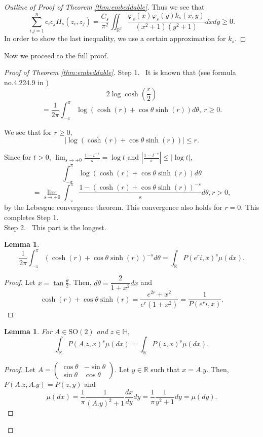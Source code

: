 \documentclass[journal]{IEEEtran}
\newtheorem{lemma}[theorem]{Lemma}
\begin{document}
\begin{proof}[Outline of Proof of Theorem \ref{thm:embeddable}]
Thus we see that 
\[ \sum_{i.j=1}^{n} c_i c_j H_s (z_i, z_j) = \frac{C_s}{\pi^2} \iint_{\mathbb R^2} \frac{\varphi_s (x) \varphi_s (y) k_s (x,y)}{(x^2 + 1)(y^2 + 1)} dxdy \ge 0. \]
In order to show the last inequality, we use a certain approximation for $k_s$.  
\end{proof}
 
Now we proceed to the full proof. 

\begin{proof}[Proof of Theorem \ref{thm:embeddable}]
Step 1. \ 
It is known that (see formula no.4.224.9 in \cite{gradshteyn2014table})
\[ 2 \log \cosh \left(\frac{r}{2}\right) \]
\[= \frac{1}{2\pi} \int_{-\pi}^{\pi} \log\left(\cosh(r) + \cos\theta \sinh (r) \right) d\theta,  \ r \ge 0. \]

We see that for $r \ge 0$, 
\[ \left|\log (\cosh(r) + \cos\theta \sinh (r)) \right| \le r.  \]

Since for $t > 0$, $\displaystyle\lim_{s \to +0} \frac{1 - t^{-s}}{s} = \log t$ 
and $\displaystyle\left|\frac{1 - t^{-s}}{s}\right| \le |\log t|$, 
\[ \int_{-\pi}^{\pi} \log\left(\cosh(r) +\cos\theta \sinh(r) \right) d\theta \]
\[= \lim_{s \to +0} \int_{-\pi}^{\pi} \frac{1 - \left(\cosh(r) +\cos\theta \sinh (r) \right)^{-s}}{s}d\theta, r > 0, \]
by the Lebesgue convergence theorem. 
This convergence also holds for $r=0$. 
This completes Step 1. \\  

Step 2. \ This part is the longest.  
\begin{lemma}\label{lem:transfer}
\[ \frac{1}{2\pi} \int_{-\pi}^{\pi} \left(\cosh(r) +\cos\theta \sinh (r) \right)^{-s} d\theta = \int_{\mathbb R} P(e^r i, x)^s \mu(dx).  \]
\end{lemma}

\begin{proof}
Let $x = \tan \frac{\theta}{2}$. 
Then, 
$d\theta = \dfrac{2}{1+x^2} dx$ and 
\[ \cosh(r) +\cos\theta \sinh (r) = \frac{e^{2r} + x^2}{e^r (1+x^2)} = \frac{1}{P(e^r i, x)}. \]
\end{proof}

\begin{lemma}\label{lem:rot-inv}
For $A \in \mathrm{SO}(2)$ and $z \in \mathbb H$, 
\[ \int_{\mathbb R} P(A.z,x)^s \mu(dx) =  \int_{\mathbb R} P(z,x)^s \mu(dx). \]
\end{lemma}

\begin{proof}
Let 
$A = \begin{pmatrix} \cos\theta & -\sin\theta \\ \sin\theta & \cos\theta \end{pmatrix}$. 
Let $y \in \mathbb R$ such that $x = A.y$. 
Then, $P(A.z, A.y) = P(z,y)$ 
and 
\[ \mu(dx) = \frac{1}{\pi} \frac{1}{(A.y)^2 + 1} \frac{dx}{dy} dy = \frac{1}{\pi} \frac{1}{y^2 + 1} dy = \mu(dy). \]
\end{proof}


\end{proof}
\end{document}
